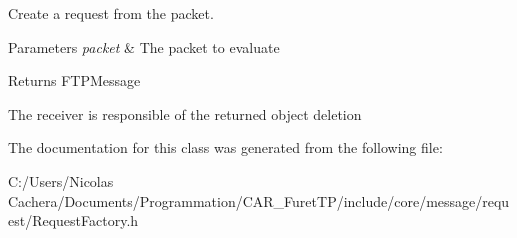 Create a request from the packet. 


\begin{DoxyParams}{Parameters}
{\em packet} & The packet to evaluate \\
\hline
\end{DoxyParams}
\begin{DoxyReturn}{Returns}
F\+T\+P\+Message
\end{DoxyReturn}
The receiver is responsible of the returned object deletion 

The documentation for this class was generated from the following file\+:\begin{DoxyCompactItemize}
\item 
C\+:/\+Users/\+Nicolas Cachera/\+Documents/\+Programmation/\+C\+A\+R\+\_\+\+Furet\+T\+P/include/core/message/request/Request\+Factory.\+h\end{DoxyCompactItemize}

